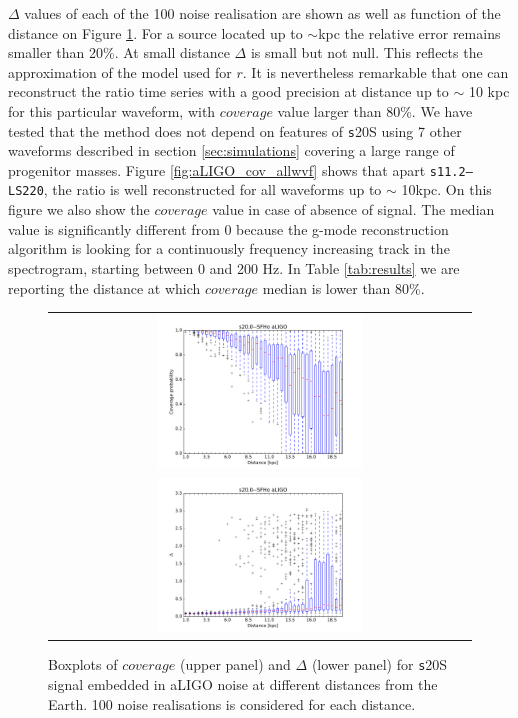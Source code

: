 $\Delta$ values of each of the 100 noise realisation are shown as well as function of the distance
on Figure \ref{fig:s20results}. For a source located up to $\sim$\unit[10]{kpc} the relative error
remains smaller than 20\%. At small distance $\Delta$ is small but not null. This reflects the
approximation of the model used for $r$.
It is nevertheless remarkable that one can reconstruct the ratio time series with a good
precision at distance up to $\sim$ 10 kpc for this particular waveform, with $coverage$ value
larger than 80\%.
We have tested that the method does not depend on features of {\texttt s20S} using 7 other waveforms
described in section \ref{sec:simulations} covering a large range of progenitor masses.
Figure \ref{fig:aLIGO_cov_allwvf} shows that apart {\tt s11.2--LS220}, the ratio is well
reconstructed for all waveforms up to $\sim$ 10kpc. On this figure we also show the $coverage$
value in case of absence of signal. The median value is significantly different from 0 because
the g-mode reconstruction algorithm is looking for a continuously frequency increasing track
in the spectrogram, starting between 0 and 200 Hz. In Table \ref{tab:results} we are reporting the
distance at which $coverage$ median is lower than 80\%. 



\begin{figure}
  \centering
  \begin{tabular}{c}
    \includegraphics[width=0.5\textwidth]{plots/s20--SFHo_covpbb_boxplot_aLIGO} \\
    \includegraphics[width=0.5\textwidth]{plots/s20--SFHo_error_boxplot_aLIGO} \\
  \end{tabular}
    
 \caption{Boxplots of $coverage$ (upper panel) and $\Delta$ (lower panel) for {\texttt s20S} signal embedded in aLIGO noise at different distances from the Earth. 100 noise realisations is considered for each distance.} \label{fig:s20results}
\end{figure}


